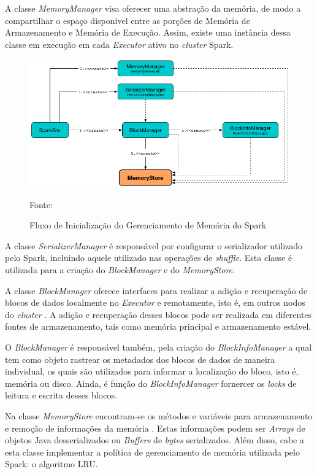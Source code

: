 A classe \textit{MemoryManager} visa oferecer uma abstração da memória, de modo a compartilhar o espaço disponível entre as porções de Memória de Armazenamento e Memória de Execução. Assim, existe uma instância dessa classe em execução em cada \textit{Executor} ativo no \textit{cluster} Spark.

\begin{figure}[!ht]
    \caption{Fluxo de Inicialização do Gerenciamento de Memória do Spark}
    \begin{center}
        \includegraphics[scale=0.52]{imagens/criacao-memorystore.png}
    \end{center}
    \small{Fonte: \cite{laskowski2017mastering}}
    \label{fig:criacao-memorystore}
\end{figure}

A classe \textit{SerializerManager} é responsável por configurar o serializador utilizado pelo Spark, incluindo aquele utilizado nas operações de \textit{shuffle}. Esta classe é utilizada para a criação do \textit{BlockManager} e do \textit{MemoryStore}.

A classe \textit{BlockManager} oferece interfaces para realizar a adição e recuperação de blocos de dados localmente no \textit{Executor} e remotamente, isto é, em outros nodos do \textit{cluster} \cite{BlockManagerSpark}. A adição e recuperação desses blocos pode ser realizada em diferentes fontes de armazenamento, tais como memória principal e armazenamento estável.

O \textit{BlockManager} é responsável também, pela criação do \textit{BlockInfoManager} a qual tem como objeto rastrear os metadados dos blocos de dados de maneira individual, os quais são utilizados para informar a localização do bloco, isto é, memória ou disco. Ainda, é função do \textit{BlockInfoManager} fornercer os \textit{locks} de leitura e escrita desses blocos.

Na classe \textit{MemoryStore} encontram-se os métodos e variáveis para armazenamento e remoção de informações da memória \cite{MemoryStoreSpark}. Estas informações podem ser \textit{Arrays} de objetos Java desserializados ou \textit{Buffers} de \textit{bytes} serializados. Além disso, cabe a esta classe implementar a política de gerenciamento de memória utilizada pelo Spark: o algoritmo LRU.

